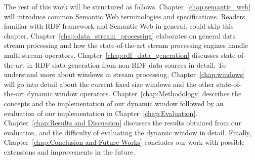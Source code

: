 The rest of this work will be structured as follows. Chapter~\ref{chap:semantic_web} will 
introduce common Semantic Web terminologies and specifications. Readers familiar
with RDF framework and Semantic Web in general, could skip this chapter. 
Chapter~\ref{chap:data_stream_processing} elaborates on general data stream processing 
and how the state-of-the-art stream processing engines handle multi-stream operators. 
Chapter~\ref{chap:rdf_data_generation} discusses state-of-the-art in 
RDF data generation from non-RDF data sources in detail. 
To understand more about windows in stream processing, Chapter~\ref{chap:windows}
will go into detail about the current fixed size windows and the other state-of-the-art 
dynamic window operators. Chapter~\ref{chap:Methodology} describes the concepts and the 
implementation of our dynamic window followed by an evaluation of our implementation in 
Chapter~\ref{chap:Evaluation}. Chapter~\ref{chap:Results and Discussion} discusses the results 
obtained from our evaluation, and the difficulty of evaluating the dynamic window in detail. 
Finally, Chapter~\ref{chap:Conclusion and Future Works} concludes our work with possible extensions and 
improvements in the future. 
